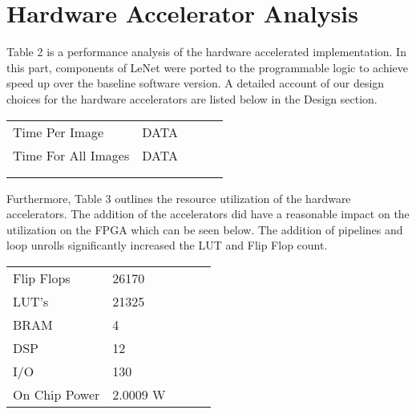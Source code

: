 \documentclass[letterpaper, 10 pt, conference]{IEEEconf}  %
\begin{document}
\section{Hardware Accelerator Analysis}
Table 2 is a performance analysis of the hardware accelerated implementation. In this part,  components of LeNet were ported to the programmable logic to achieve speed up over the baseline software version.  A detailed account of our design choices for the hardware accelerators are listed below in the Design section. 

\begin{table}[H]
\begin{center}
\begin{tabular}{lllll}
\cline{1-2}
\multicolumn{1}{|l|}{Time Per Image}      & \multicolumn{1}{l|}{DATA} &  &  &  \\ \cline{1-2}
\multicolumn{1}{|l|}{Time For All Images} & \multicolumn{1}{l|}{DATA} &  &  &  \\ \cline{1-2}
                                          &                       &  &  &  \\
                                          &                       &  &  & 
\end{tabular}
\end{center}
\end{table} 

Furthermore, Table 3 outlines the resource utilization of the hardware accelerators. The addition of the accelerators did have a reasonable impact on the utilization on the FPGA which can be seen below. The addition of pipelines and loop unrolls significantly increased the LUT and Flip Flop count. 


\begin{table}[H]
\begin{center}
\begin{tabular}{|l|l|lll}
\cline{1-2}
Flip Flops    & 26170  &  &  &  \\ \cline{1-2}
LUT's         & 21325  &  &  &  \\ \cline{1-2}
BRAM          & 4      &  &  &  \\ \cline{1-2}
DSP           & 12     &  &  &  \\ \cline{1-2}
I/O           & 130    &  &  &  \\ \cline{1-2}
On Chip Power & 2.0009 W&  &  &  \\ \cline{1-2}
\end{tabular}
\end{center}
\end{table}
\end{document}
